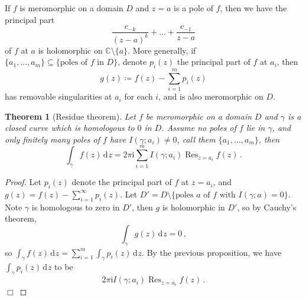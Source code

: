 \documentclass{article}
\theoremstyle{plain}\theoremheaderfont{\normalfont\itshape}\theorembodyfont{\rmfamily}\theoremseparator{.}\newtheorem*{rem}{Remark}\newtheorem*{ex}{Example}\newtheorem*{proof}{Proof}\newtheorem*{altp}{Alternative proof}\newtheorem*{con}{Consequences}\newtheorem*{notn}{Notations}\newtheorem*{cau}{Caution}\newtheorem*{term}{Terminology}\newtheorem*{keyex}{Key example}
\theoremstyle{plain}\theoremheaderfont{\normalfont\bfseries}\theorembodyfont{\rmfamily}\theoremseparator{.}\newtheorem{thm}{Theorem}[section]\newtheorem{lem}[thm]{Lemma}\newtheorem{prop}[thm]{Proposition}\newtheorem*{cor}{Corollary}\newtheorem{defn}[thm]{Definition}\newtheorem{clm}[thm]{Claim}\newtheorem{clminproof}{Claim}\newtheorem{leminproof}{Lemma}\newtheorem{app}{Application}
\theoremstyle{break}\theoremheaderfont{\normalfont\itshape}\theorembodyfont{\rmfamily}\theoremseparator{.\medskip}\newtheorem*{proofskip}{Proof}\newtheorem*{exs}{Examples}\newtheorem*{rems}{Remarks}\newtheorem*{rec}{Recall}\newtheorem*{ppts}{Properties}
\theoremstyle{break}\theoremheaderfont{\normalfont\bfseries}\theorembodyfont{\rmfamily}\theoremseparator{.\medskip}\newtheorem{lemskip}[thm]{Lemma}\newtheorem{defnskip}[thm]{Definition}\newtheorem{propskip}[thm]{Proposition}\newtheorem{thmskip}[thm]{Theorem}
\numberwithin{equation}{section}
\newcommand{\ii}{\mathrm{i}}
\DeclareMathOperator*{\Res}{Res}
\newcommand{\qed}{\hfill\ensuremath{\Box}}
\newcommand{\dd}[2][]{\,\mathrm{d}^{#1} #2}
\newcommand{\CC}{\mathbb{C}}
\begin{document}
    If \(f\) is meromorphic on a domain \(D\) and \(z=a\) is a pole of \(f\), then we have the principal part
    \[\frac{c_{-k}}{(z-a)^k}+\dots+\frac{c_{-1}}{z-a}\]
    of \(f\) at \(a\) is holomorphic on \(\CC\setminus\{a\}\). More generally, if \(\{a_1,\dots,a_m\}\subseteq\{\text{poles of }f\text{ in }D\}\), denote \(p_i(z)\) the principal part of \(f\) at \(a_i\), then
    \[g(z)\coloneqq f(z)-\sum_{i=1}^{m}p_i(z)\]
    has removable singularities at \(a_i\) for each \(i\), and is also meromorphic on \(D\).
    \begin{thm}[Residue theorem]
        Let \(f\) be meromorphic on a domain \(D\) and \(\gamma\) is a closed curve which is homologous to \(0\) in \(D\). Assume no poles of \(f\) lie in \(\gamma\), and only finitely many poles of \(f\) have \(I(\gamma;a_i)\ne 0\), call them \(\{a_1,\dots,a_m\}\), then
        \[\int_\gamma f(z)\dd{z}=2\pi \ii\sum_{i=1}^{m}I(\gamma;a_i)\Res_{z=a_i}f(z)\,.\]
    \end{thm}
    \begin{proof}
        Let \(p_i(z)\) denote the principal part of \(f\) at \(z=a_i\), and \(g(z)=f(z)-\sum_{i=1}^{\infty}p_i(z)\). Let \(D'=D\setminus\{\text{poles }a\text{ of }f\text{ with }I(\gamma;a)=0\}\). Note \(\gamma\) is homologous to zero in \(D'\), then \(g\) is holomorphic in \(D'\), so by Cauchy's theorem,
        \[\int_\gamma g(z)\dd{z}=0\,,\]
        so \(\int_\gamma f(z)\dd{z}=\sum_{i=1}^{m}\int_\gamma p_i(z)\dd{z}\). By the previous proposition, we have \(\int_\gamma p_i(z)\dd{z}\) to be
        \[2\pi \ii I(\gamma;a_i)\Res_{z=a_i}f(z)\,.\]\qed
    \end{proof}
\end{document}
